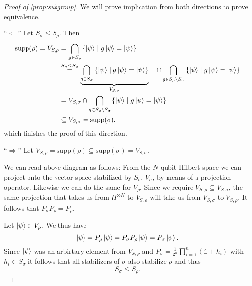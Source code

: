 \begin{proof}[Proof of \cref{prop:subgroup}]
  We will prove implication from both directions to prove equivalence.

  \enquote{$\Leftarrow$} Let $S_\sigma \leq S_\rho$. Then
  \begin{align*}
    \mathrm{supp}(\rho) = V_{S,\rho} &= \bigcap_{g\in S_\rho} \left\{ \ket{\psi} \mid
    g\ket{\psi} = \ket{\psi} \right\} \\
        &\overset{S_\sigma \leq S_\rho}{=} \underbrace{\bigcap_{g\in S_\sigma}
        \left\{\ket{\psi} \mid g \ket{\psi} =
        \ket{\psi}\right\}}_{V_{S,\sigma}}\ \ \ \cap \bigcap_{g \in S_\rho \setminus
        S_\sigma} \left\{\ket{\psi} \mid g \ket{\psi} =
        \ket{\psi}\right\}\\
        &= V_{S,\sigma} \cap \bigcap_{g \in S_\rho \setminus
        S_\sigma} \left\{\ket{\psi} \mid g \ket{\psi} =
        \ket{\psi}\right\}\\
        &\subseteq V_{S,\sigma} = \mathrm{supp}(\sigma)
  .\end{align*}
  which finishes the proof of this direction.

  \enquote{$\Rightarrow$} Let $V_{S,\rho} = \mathrm{supp}(\rho) \subseteq
  \mathrm{supp}(\sigma) = V_{S,\sigma}$. 


  We can read above diagram as follows: From the $N$-qubit Hilbert space we can
  project onto the vector space stabilized by $S_\sigma$, $V_\sigma$, by means of a
  projection operator. Likewise we can do the same for $V_\rho$. Since we
  require $V_{S,\rho} \subseteq V_{S,\sigma}$, the same projection that takes
  us from $H^{\otimes N}$ to $V_{S,\rho}$ will take us from $V_{S,\sigma}$ to
  $V_{S,\rho}$. It follows that $P_\sigma P_\rho = P_\rho$.

  Let $\ket{\psi} \in V_\rho$. We thus have
  \[
    \ket{\psi} = P_\rho \ket{\psi} = P_\sigma P_\rho \ket{\psi} = P_\sigma
    \ket{\psi}.
  \]
  Since $\ket{\psi}$ was an arbirtary element from $V_{S,\rho}$ and $P_\sigma =
  \frac{1}{2^n} \prod_{i=1}^n \left(\mathds{1} + h_i\right)$ with $h_i \in
  S_\sigma$ it follows that all stabilizers of $\sigma$ also stabilize $\rho$
  and thus
  \[
    S_\sigma \leq S_\rho.
  \]


\end{proof}
